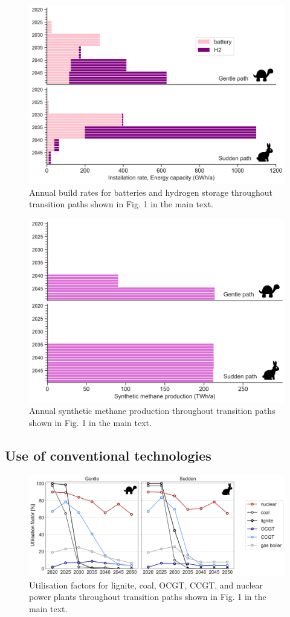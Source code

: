 \documentclass[3p]{elsarticle} %
\begin{document}
\begin{figure}[!h]
\centering
\includegraphics[width=0.7\columnwidth]{figures/storage_expansion_Base.png}
\caption{Annual build rates for batteries and hydrogen storage throughout transition paths shown in Fig. 1 in the main text.} \label{fig_battery_hydrogen} 
\end{figure}

\begin{figure}[!h]
\centering
\includegraphics[width=0.7\columnwidth]{figures/methanation_expansion_Base.png}
\caption{Annual synthetic methane production throughout transition paths shown in Fig. 1 in the main text.} \label{fig_synthetic_methane} 
\end{figure}

\FloatBarrier

\subsection{Use of conventional technologies}

\begin{figure}[!h]
\centering
\includegraphics[width=0.8\columnwidth]{figures/utilisation_factors_Base.png}
\caption{Utilisation factors for lignite, coal, OCGT, CCGT, and nuclear power plants throughout transition paths shown in Fig. 1 in the main text.} \label{fig_utilisation_factors} 
\end{figure}
\end{document}
